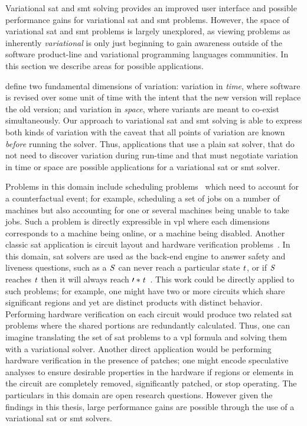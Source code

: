 \label{section:conclusion:applications}
%
Variational \ac{sat} and \ac{smt} solving provides an improved user interface
and possible performance gains for variational \ac{sat} and \ac{smt} problems.
However, the space of variational \ac{sat} and \ac{smt} problems is largely
unexplored, as viewing problems as inherently \emph{variational} is only just
beginning to gain awareness outside of the software product-line and variational
programming languages communities. In this section we describe areas for
possible applications.

\citet{TTS+:VariVolution19} define two fundamental dimensions of variation:
variation in \emph{time}, where software is revised over some unit of time with
the intent that the new version will replace the old version; and variation in
\emph{space}, where variants are meant to co-exist simultaneously. Our approach
to variational \ac{sat} and \ac{smt} solving is able to express both kinds of
variation with the caveat that all points of variation are known \emph{before}
running the solver. Thus, applications that use a plain \ac{sat} solver, that do
not need to discover variation during run-time and that must negotiate variation
in time or space are possible applications for a variational \ac{sat} or
\ac{smt} solver.

Problems in this domain include scheduling problems~\cite{BBH+09} which need to
account for a counterfactual event; for example, scheduling a set of jobs on a
number of machines but also accounting for one or several machines being unable
to take jobs. Such a problem is directly expressible in \ac{vpl} where each
dimensions corresponds to a machine being online, or a machine being disabled.
Another classic \ac{sat} application is circuit layout and hardware verification
problems~\cite{BBH+09}. In this domain, \ac{sat} solvers are used as the
back-end engine to answer safety and liveness questions, such as a $\mathit{S}$ can
never reach a particular state $\mathit{t}$, or if $\mathit{S}$ reaches $\mathit{t}$ then it
will always reach $\mathit{\prime*{t}}$~\cite{BBH+09}. This work could be directly
applied to such problems; for example, one might have two or more circuits which
share significant regions and yet are distinct products with distinct behavior.
Performing hardware verification on each circuit would produce two related
\ac{sat} problems where the shared portions are redundantly calculated. Thus,
one can imagine translating the set of \ac{sat} problems to a \ac{vpl} formula
and solving them with a variational solver. Another direct application would be
performing hardware verification in the presence of patches; one might encode
speculative analyses to ensure desirable properties in the hardware if regions
or elements in the circuit are completely removed, significantly patched, or
stop operating. The particulars in this domain are open research questions.
However given the findings in this thesis, large performance gains are possible
through the use of a variational \ac{sat} or \ac{smt} solvers.

